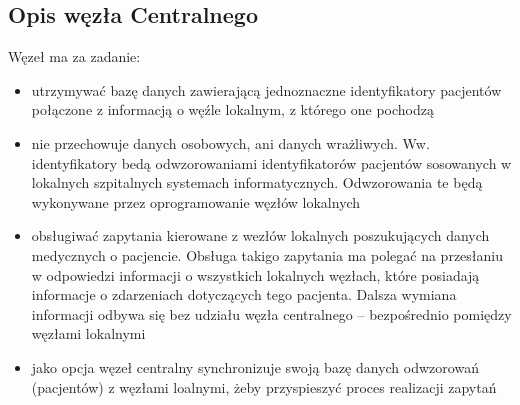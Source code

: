 \documentclass[a4paper]{article}
\begin{document}
\subsection{Opis węzła Centralnego}
Węzeł ma za zadanie:
\begin{itemize}
\item utrzymywać bazę danych zawierającą jednoznaczne identyfikatory pacjentów połączone z informacją o węźle lokalnym, z którego one pochodzą
\item nie przechowuje danych osobowych, ani danych wrażliwych. Ww. identyfikatory bedą odwzorowaniami identyfikatorów pacjentów sosowanych w lokalnych szpitalnych systemach informatycznych. Odwzorowania te będą wykonywane przez oprogramowanie węzłów lokalnych
\item obsługiwać zapytania kierowane z wezłów lokalnych poszukujących danych medycznych o pacjencie. Obsługa takigo zapytania ma polegać na przesłaniu w odpowiedzi informacji o wszystkich lokalnych węzłach, które posiadają informacje o zdarzeniach dotyczących tego pacjenta. Dalsza wymiana informacji odbywa się bez udziału węzła centralnego – bezpośrednio pomiędzy węzłami lokalnymi
\item jako opcja węzeł centralny synchronizuje swoją bazę danych odwzorowań (pacjentów) z węzłami loalnymi, żeby przyspieszyć proces realizacji zapytań
\end{itemize}
\end{document}

